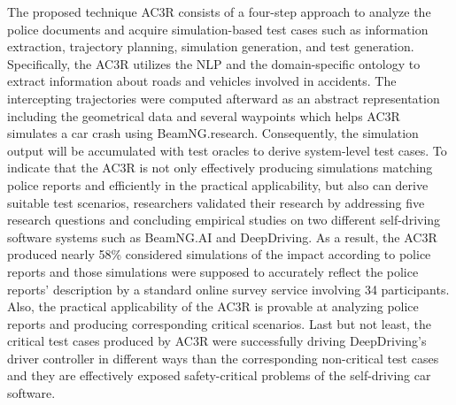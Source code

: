 \documentclass[10pt,a4paper]{report}
\begin{document}
The proposed technique AC3R consists of a four-step approach to analyze the police documents and acquire simulation-based test cases such as information extraction, trajectory planning, simulation generation, and test generation.
%
Specifically, the AC3R utilizes the NLP and the domain-specific ontology to extract information about roads and vehicles involved in accidents.
%
The intercepting trajectories were computed afterward as an abstract representation including the geometrical data and several waypoints which helps AC3R simulates a car crash using BeamNG.research.
%
Consequently, the simulation output will be accumulated with test oracles to derive system-level test cases.
%
To indicate that the AC3R is not only effectively producing simulations matching police reports and efficiently in the practical applicability, but also can derive suitable test scenarios, researchers validated their research by addressing five research questions and concluding empirical studies on two different self-driving software systems such as BeamNG.AI and DeepDriving.
%
As a result, the AC3R produced nearly 58\% considered simulations of the impact according to police reports and those simulations were supposed to accurately reflect the police reports' description by a standard online survey service involving 34 participants. 
%
Also, the practical applicability of the AC3R is provable at analyzing police reports and producing corresponding critical scenarios.
%
Last but not least, the critical test cases produced by AC3R were successfully driving DeepDriving’s driver controller in different ways than the corresponding non-critical test cases and they are effectively exposed safety-critical problems of the self-driving car software.
\end{document}
